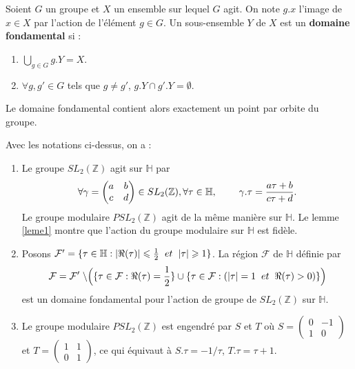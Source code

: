 \documentclass[a4paper]{article}
\begin{document}
\begin{definition}
Soient $G$ un groupe et $X$ un ensemble sur lequel $G$ agit. On note $g.x$ l'image de $x \in X$ par l'action de l'élément $g \in G$. Un sous-ensemble $Y$ de $X$ est un \textbf{domaine fondamental} si : 
\begin{enumerate}
\item $\bigcup\limits_{g \in G} g.Y=X$.
\item $\forall g,g' \in G$ tels que $g \neq g'$, $g.Y \cap g'.Y = \emptyset$.
\end{enumerate}
Le domaine fondamental contient alors exactement un point par orbite du groupe.
\end{definition}

\begin{prop} \label{modul}
Avec les notations ci-dessus, on a :
\begin{enumerate}
\item Le groupe $SL_{2}(\mathbb{Z})$ agit sur $\mathbb{H}$ par
\begin{equation*}
\forall \gamma=\begin{pmatrix} 
a & b \\
c & d 
\end{pmatrix} \in SL_{2}(\mathbb{Z}), \forall \tau \in \mathbb{H}, \hspace{0.8cm}
\gamma.\tau=\frac{a\tau+b}{c\tau+d}.
\end{equation*}
Le groupe modulaire $PSL_{2}(\mathbb{Z})$ agit de la même manière sur $\mathbb{H}$. Le lemme \ref{leme1} montre que l'action du groupe modulaire sur $\mathbb{H}$ est fidèle.
\item 
Posons $\mathcal{F}'=\{\tau \in \mathbb{H} : |\Re(\tau)| \leqslant \frac{1}{2} \hspace{0.2cm} et \hspace{0.2cm} |\tau | \geqslant 1 \}$.
La région $\mathcal{F}$ de $\mathbb{H}$ définie par
\begin{equation*}
\mathcal{F}=\mathcal{F}' \hspace{0.1cm} \backslash \Big(\{\tau \in \mathcal{F} : \Re(\tau)=\frac{1}{2} \} \cup \{\tau \in \mathcal{F} : (|\tau|=1 \hspace{0.2cm} et \hspace{0.2cm} \Re(\tau)>0) \}\Big)
\end{equation*}
est un domaine fondamental pour l'action de groupe de $SL_{2}(\mathbb{Z})$ sur $\mathbb{H}$.
\item Le groupe modulaire $PSL_{2}(\mathbb{Z})$ est engendré par $S$ et $T$ où $S=\begin{pmatrix} 
0 & -1 \\
1 & 0 
\end{pmatrix}
$
et $T=\begin{pmatrix} 
1 & 1 \\
0 & 1 
\end{pmatrix}
$, ce qui équivaut à $S.\tau=-1/\tau$, $T.\tau =\tau+1$.
\end{enumerate}
\end{prop}
\end{document}
